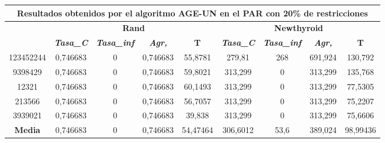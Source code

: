 \documentclass[12pt, spanish]{article}
\begin{document}
\begin{table}[H]
\footnotesize
\begin{tabular}{|c|c|c|c|c|c|c|c|c|}
\hline
\multicolumn{9}{|c|}{\textbf{Resultados obtenidos por el algoritmo AGE-UN en el PAR con 20\% de restricciones}}                                                                                                   \\ \hline
\multirow{2}{*}{} & \multicolumn{4}{c|}{\textbf{Rand}}                                                            & \multicolumn{4}{c|}{\textbf{Newthyroid}}                                                      \\ \cline{2-9} 
                  & \textit{\textbf{Tasa\_C}} & \textit{\textbf{Tasa\_inf}} & \textit{\textbf{Agr,}} & \textbf{T} & \textit{\textbf{Tasa\_C}} & \textit{\textbf{Tasa\_inf}} & \textit{\textbf{Agr,}} & \textbf{T} \\ \hline
123452244         & 0,746683                  & 0                           & 0,746683               & 55,8781    & 279,81                    & 268                         & 691,924                & 130,792    \\ \hline
9398429           & 0,746683                  & 0                           & 0,746683               & 59,8021    & 313,299                   & 0                           & 313,299                & 135,768    \\ \hline
12321             & 0,746683                  & 0                           & 0,746683               & 60,1493    & 313,299                   & 0                           & 313,299                & 77,5305    \\ \hline
213566            & 0,746683                  & 0                           & 0,746683               & 56,7057    & 313,299                   & 0                           & 313,299                & 75,2207    \\ \hline
3939021           & 0,746683                  & 0                           & 0,746683               & 39,838     & 313,299                   & 0                           & 313,299                & 75,6606    \\ \hline
\textbf{Media}    & 0,746683                  & 0                           & 0,746683               & 54,47464   & 306,6012                  & 53,6                        & 389,024                & 98,99436   \\ \hline
\end{tabular}
\end{table}
\end{document}
